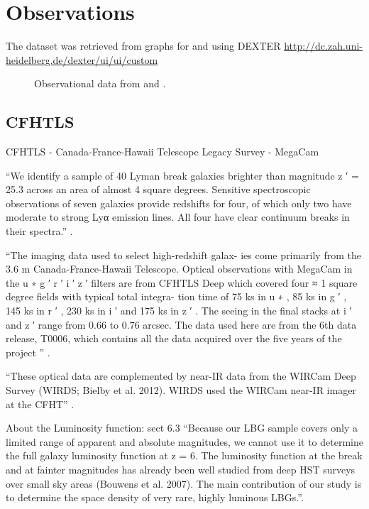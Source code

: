 \section{Observations}

The dataset was retrieved from graphs for \cite{bouwens14} and \cite{mclure09} 
using DEXTER
\url{http://dc.zah.uni-heidelberg.de/dexter/ui/ui/custom}


\begin{figure}
\caption{Observational data from \cite{bouwens14,mclure09}and \cite{willott13}.}
\label{graph_observational_data}
\end{figure}

  \subsection{CFHTLS}
  
  CFHTLS - Canada-France-Hawaii Telescope Legacy Survey - 
MegaCam\citep{willott13}

  ``We identify a sample of 40 Lyman break galaxies brighter than
    magnitude z ′ = 25.3 across an area of almost 4 square degrees.
    Sensitive spectroscopic observations of seven galaxies provide 
    redshifts for four, of which only two have moderate to strong 
    Lyα emission lines. All four have clear continuum breaks in 
    their spectra.'' \cite{willott13}.

  ``The imaging data used to select high-redshift galax-
    ies come primarily from the 3.6 m Canada-France-Hawaii
    Telescope. Optical observations with MegaCam in the
    u ∗ g ′ r ′ i ′ z ′ filters are from CFHTLS Deep which covered
    four ≈ 1 square degree fields with typical total integra-
    tion time of 75 ks in u ∗ , 85 ks in g ′ , 145 ks in r ′ , 230 ks in
    i ′ and 175 ks in z ′ . The seeing in the final stacks at i ′ and
    z ′ range from 0.66 to 0.76 arcsec. The data used here are
    from the 6th data release, T0006, which contains all the
    data acquired over the five years of the project '' \cite{willott13}.

  ``These optical data are complemented by near-IR data
    from the WIRCam Deep Survey (WIRDS; Bielby et al.
    2012). WIRDS used the WIRCam near-IR imager at
    the CFHT'' \cite{willott13}.

   About the Luminosity function: sect 6.3
   ``Because our LBG sample covers only a limited range of
    apparent and absolute magnitudes, we cannot use it to determine
    the full galaxy luminosity function at z = 6. The luminosity
    function at the break and at fainter magnitudes has already
    been well studied from deep HST surveys over small sky areas
    (Bouwens et al. 2007). The main contribution of our study is
    to determine the space density of very rare, highly luminous
    LBGs.''\cite{willott13}.

